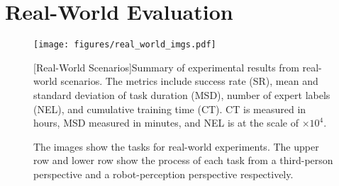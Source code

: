 \section{Real-World Evaluation}
\label{sec:real_world_evaluation}

\label{sec:real_exp}

\begin{figure*}[htbp]
\centering
\begin{minipage}{\textwidth}
    \centering
    \texttt{[image: figures/real\_world\_imgs.pdf]} 
    \caption{The images show the tasks for real-world experiments. The upper row and lower row show the process of each task from a third-person perspective and a robot-perception perspective respectively.}
    \label{fig:real_world_scenarios}
\end{minipage}

\vspace{1em} 

\begin{minipage}{\textwidth}
    \centering
    \renewcommand\arraystretch{1.05}
    [Real-World Scenarios]{Summary of experimental results from real-world scenarios. The metrics include success rate (SR), mean and standard deviation of task duration (MSD), number of expert labels (NEL), and cumulative training time (CT). CT is measured in hours, MSD measured in minutes, and NEL is at the scale of $\times 10^{4}$.}
    \label{tab:real_scenarios}
\end{minipage}
\end{figure*}
